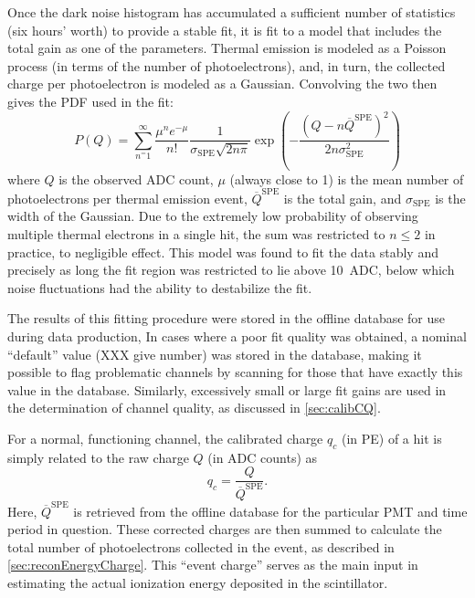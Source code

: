 \documentclass[../thesis.tex]{subfiles}
\begin{document}
Once the dark noise histogram has accumulated a sufficient number of statistics
(six hours' worth) to provide a stable fit, it is fit to a model that includes
the total gain as one of the parameters. Thermal emission is modeled as a
Poisson process (in terms of the number of photoelectrons), and, in turn, the
collected charge per photoelectron is modeled as a Gaussian. Convolving the two
then gives the PDF used in the fit:
\begin{equation*}
  P(Q) = \sum_{n^=1}^{\infty} \frac{\mu^n e^{-\mu}}{n!} \frac{1}{\sigma_{\mathrm{SPE}}\sqrt{2n\pi}} \exp\left(-\frac{(Q - n\overline Q^{\mathrm{SPE}})^2}{2n\sigma_{\mathrm{SPE}}^2}\right)
\end{equation*}
where $Q$ is the observed ADC count, $\mu$ (always close to 1) is the mean
number of photoelectrons per thermal emission event, $\overline
Q^{\mathrm{SPE}}$ is the total gain, and $\sigma_{\mathrm{SPE}}$ is the width of
the Gaussian. Due to the extremely low probability of observing multiple thermal
electrons in a single hit, the sum was restricted to $n \le 2$ in practice, to
negligible effect. This model was found to fit the data stably and precisely as
long the fit region was restricted to lie above 10~ADC, below which noise
fluctuations had the ability to destabilize the fit.

The results of this fitting procedure were stored in the offline database for
use during data production, In cases where a poor fit quality was obtained, a
nominal ``default'' value (XXX give number) was stored in the database, making
it possible to flag problematic channels by scanning for those that have exactly
this value in the database. Similarly, excessively small or large fit gains are
used in the determination of channel quality, as discussed in
\autoref{sec:calibCQ}.

For a normal, functioning channel, the calibrated charge $q_c$ (in PE) of a hit
is simply related to the raw charge $Q$ (in ADC counts) as
\begin{equation}
  \label{eq:corrChg}
  q_c = \frac{Q}{\overline Q^{\mathrm{SPE}}}.
\end{equation}
Here, $\overline Q^{\mathrm{SPE}}$ is retrieved from the offline database for
the particular PMT and time period in question. These corrected charges are then
summed to calculate the total number of photoelectrons collected in the event,
as described in \autoref{sec:reconEnergyCharge}. This ``event charge'' serves as
the main input in estimating the actual ionization energy deposited in the
scintillator.
\end{document}
